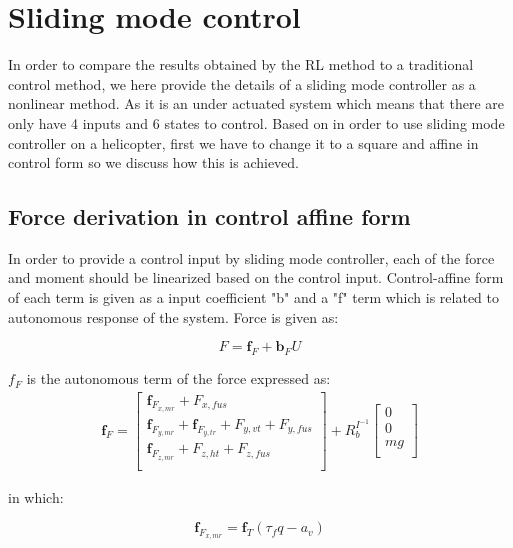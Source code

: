 \section{Sliding mode control}
In order to compare the results obtained by the RL method to a traditional control method, we here provide the details of a sliding mode controller as a nonlinear method. As it is an under actuated system which means that there are only have 4 inputs and 6 states to control. Based on \cite{slotine1991applied,pourrezaei2014control} in order to use sliding mode controller on a helicopter, first we have to change it to a square and affine in control form  so  we discuss how this is achieved.

\subsection{Force derivation in control affine form} \label{force section_affine}
In order to provide a control input by sliding mode controller, each of the force and moment should be linearized based on the control input. Control-affine form of each term is given as a input coefficient "b" and a "f" term which is related to autonomous response of the system. Force is given as:

\begin{equation}\label{Force eq}
	F=\textbf{f}_F+\textbf{b}_FU
\end{equation}

$f_F$ is the autonomous term of the force expressed as:
\begin{gather}\label{F_0}
	\textbf{f}_F
	=
	\begin{bmatrix}
		\textbf{f}_{F_{x,mr}}+F_{x,fus} \\
		\textbf{f}_{F_{y,mr}}+\textbf{f}_{F_{y,tr}}+F_{y,vt}+F_{y,fus}\\
		\textbf{f}_{F_{z,mr}}+F_{z,ht}+F_{z,fus} \\
	\end{bmatrix}
	+R_b^{I^{-1}}\begin{bmatrix}
		0 \\
		0\\
		mg \\
	\end{bmatrix}
\end{gather}

in which:

\begin{equation}\label{f_X_MR}
	\textbf{f}_{F_{x,mr}}=\textbf{f}_T(\tau_f q-a_v)
\end{equation}
 
